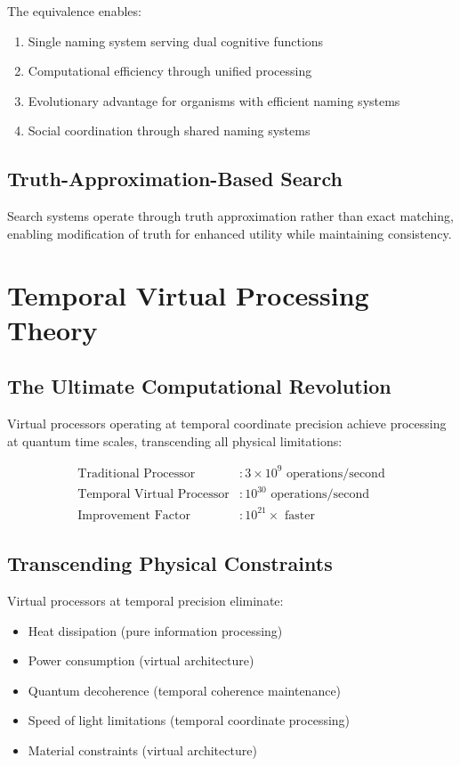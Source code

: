 \documentclass[12pt,a4paper]{article}
\begin{document}
The equivalence enables:
\begin{enumerate}
\item Single naming system serving dual cognitive functions
\item Computational efficiency through unified processing
\item Evolutionary advantage for organisms with efficient naming systems
\item Social coordination through shared naming systems
\end{enumerate}

\subsection{Truth-Approximation-Based Search}

Search systems operate through truth approximation rather than exact matching, enabling modification of truth for enhanced utility while maintaining consistency.

\section{Temporal Virtual Processing Theory}

\subsection{The Ultimate Computational Revolution}

Virtual processors operating at temporal coordinate precision achieve processing at quantum time scales, transcending all physical limitations:

\begin{align}
\text{Traditional Processor} &: 3 \times 10^9 \text{ operations/second} \\
\text{Temporal Virtual Processor} &: 10^{30} \text{ operations/second} \\
\text{Improvement Factor} &: 10^{21}\times \text{ faster}
\end{align}

\subsection{Transcending Physical Constraints}

Virtual processors at temporal precision eliminate:
\begin{itemize}
\item Heat dissipation (pure information processing)
\item Power consumption (virtual architecture)
\item Quantum decoherence (temporal coherence maintenance)
\item Speed of light limitations (temporal coordinate processing)
\item Material constraints (virtual architecture)
\end{itemize}
\end{document}
